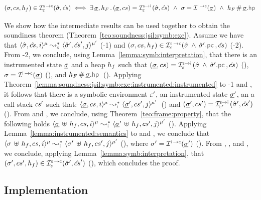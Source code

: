 \begin{lemma}\label{lemma:symb:interpretation}
$$
(\jstate, \cs, \heap_f) \in \interpret{\symbconc}{\senv}(\sstate, \scs) 
   \iff 
   \exists \, \istate, h_F \, . \, 
         (\istate, \cs) = \interpret{\symbinst}{\senv}(\sstate, \scs)  
          \ \wedge \   
      \jstate = \interpret{\instconc}{}(\istate)
      \ \wedge \
      h_F \disjoint \istate.\hpsel
$$
\end{lemma}

We show how the intermediate results can be used together to 
obtain the soundiness theorem (Theorem~\ref{teo:soundness:jsil:symb:exe}). 
Assume we have that 
$\transabssemrule{\sstate, \scs, i}{\sstate', \scs', j}{\mode}{\mode'}{\symbolic}$ (\hyp{1}) and 
 $(\jstate, \cs, \heap_f) \in \interpret{\symbconc}{\senv}(\sstate \, \wedge \, \sstate'.\pcsel, \scs)$ (\hyp{2}).  
 From \hyp{2}, we conclude, using Lemma~\ref{lemma:symb:interpretation}, that there is an 
 instrumented state $\underline{\sigma}$ and a heap $h_f$ such that $(\istate, \cs) = \interpret{\symbinst}{\senv}(\sstate  \, \wedge \, \sstate'.\pcsel, \scs)$ (), 
 $\jstate = \interpret{\instconc}{}(\istate)$ (\ieq{2}), and $h_F \disjoint \istate.\hpsel$ (). 
 Applying Theorem~\ref{lemma:soundness:jsil:symb:exe:instrumented:instrumented} to \hyp{1} 
 and \ieq{1}, it follows that there is a symbolic environment $\varepsilon'$, an instrumented state $\underline{\sigma}'$, 
 an a call stack $cs'$ such that: 
$\transabssemrule{\istate, \cs, i}{\istate', \cs', j}{\mode}{\mode'}{\instrumented}$~(\ieq{4})
and $(\istate', \cs') = \interpret{\symbinst}{\senv'}(\sstate', \scs')$ ().
From \ieq{3} and \ieq{4}, we conclude, using Theorem~\ref{teo:frame:property}, that the following 
holds $\transabssemrule{\istate \dunion \heap_f, \cs, i}{\istate' \dunion \heap_f, \cs', j}{\mode}{\mode'}{\instrumented}$ (). 
Applying Lemma~\ref{lemma:instrumented:semantics} to \ieq{2} and , we conclude that 
 $\transabssemrule{\jstate \dunion \heap_f, \cs, i}{\jstate' \dunion \heap_f, \cs', j}{\mode}{\mode'}{\instrumented}$ (\goal{1}), 
 where $\jstate' = \interpret{\instconc}{}(\istate')$ (\ieq{8}).
 From \ieq{5}, \ieq{6}, and \ieq{8}, we conclude, applying Lemma~\ref{lemma:symb:interpretation}, 
 that $(\jstate', \cs', \heap_f) \in \interpret{\symbconc}{\senv}(\sstate', \scs')$ (), 
 which concludes the proof. 

\subsection{Implementation}\label{subsec:jsil:analysis:implementation}



